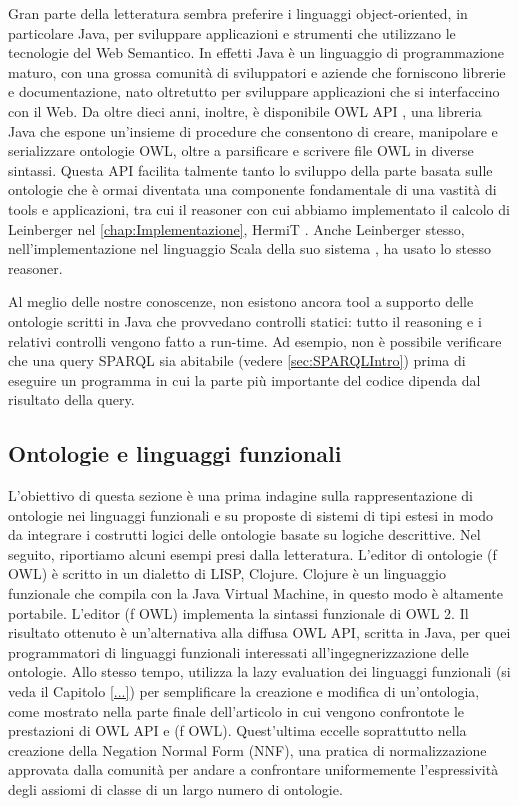 Gran parte della letteratura sembra preferire i linguaggi object-oriented, in particolare Java, per sviluppare applicazioni e strumenti che utilizzano le tecnologie del Web Semantico. In effetti Java è un linguaggio di programmazione maturo, con una grossa comunità di sviluppatori e aziende che forniscono librerie e documentazione, nato oltretutto per sviluppare applicazioni che si interfaccino con il Web. Da oltre dieci anni, inoltre, è disponibile OWL API \cite{OWLAPI}, una libreria Java che espone un'insieme di procedure che consentono di creare, manipolare e serializzare ontologie OWL, oltre a parsificare e scrivere file OWL in diverse sintassi. Questa API facilita talmente tanto lo sviluppo della parte basata sulle ontologie che è ormai diventata una componente fondamentale di una vastità di tools e applicazioni, tra cui il reasoner con cui abbiamo implementato il calcolo di Leinberger nel \autoref{chap:Implementazione}, HermiT \cite{HermiTWhitepaper}. Anche Leinberger stesso, nell'implementazione nel linguaggio Scala \cite{...} della suo sistema \cite{leinbergerScalaImpl}, ha usato lo stesso reasoner.  

Al meglio delle nostre conoscenze, non esistono ancora tool a supporto delle ontologie scritti in Java che provvedano controlli statici: tutto il reasoning e i relativi controlli vengono fatto a run-time. Ad esempio, non è possibile verificare che una query SPARQL sia abitabile (vedere \autoref{sec:SPARQLIntro}) prima di eseguire un programma in cui la parte più importante del codice dipenda dal risultato della query.

\subsection{Ontologie e linguaggi funzionali}
L'obiettivo di questa sezione è una prima indagine sulla rappresentazione di ontologie nei linguaggi funzionali e su proposte di sistemi di tipi estesi in modo da integrare i costrutti logici delle ontologie basate su logiche descrittive. Nel seguito, riportiamo alcuni esempi presi dalla letteratura.
L'editor di ontologie (f OWL) \cite{fOWL} è scritto in un dialetto di LISP, Clojure. Clojure è un linguaggio funzionale che compila con la Java Virtual Machine, in questo modo è altamente portabile. L'editor (f OWL) implementa la sintassi funzionale di OWL 2. Il risultato ottenuto è un'alternativa alla diffusa OWL API, scritta in Java, per quei programmatori di linguaggi funzionali interessati all'ingegnerizzazione delle ontologie. Allo stesso tempo, utilizza la lazy evaluation dei linguaggi funzionali (si veda il Capitolo \ref{...}) per semplificare la creazione e modifica di un'ontologia, come mostrato nella parte finale dell'articolo in cui vengono confrontote le prestazioni di OWL API e (f OWL). Quest'ultima eccelle soprattutto nella creazione della Negation Normal Form (NNF), una pratica di normalizzazione approvata dalla comunità per andare a confrontare uniformemente l'espressività degli assiomi di classe di un largo numero di ontologie.

